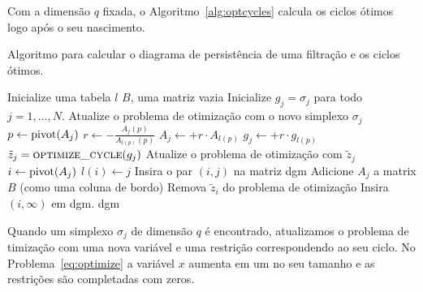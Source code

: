 Com a dimensão $q$ fixada, o Algoritmo~\ref{alg:optcycles} calcula os ciclos ótimos logo após 
o seu nascimento. 

\begin{algoritmo}[htpb!]
    \caption{Algoritmo para calcular o diagrama de persistência de uma filtração e os ciclos ótimos.}
    \label{alg:optcycles}
    \begin{algorithmic}[1]
            \State Inicialize uma tabela $l$
            \State $B$, uma matriz vazia
            \State Inicialize $g_j = \sigma_j$ para todo $j=1,\dots,N$.
                    \State Atualize o problema de otimização com o novo simplexo $\sigma_j$
                \EndIf
                    \State $p \leftarrow \text{pivot}(A_j)$
                    \State $r \leftarrow -\frac{A_j(p)}{A_{l(p)}(p)}$
                    \State $A_j \leftarrow + r \cdot A_{l(p)}$
                    \State $g_j \leftarrow + r \cdot g_{l(p)}$
                \EndWhile
                    \State $\tilde{z}_j = \textsc{optimize\_cycle}(g_j)$
                    \State Atualize o problema de otimização com $\tilde{z}_j$
                \EndIf
                    \State $i \leftarrow \text{pivot}(A_j)$
                    \State $l(i) \leftarrow j$ 
                    \State Insira o par $(i,j)$ na matriz dgm
                        \State Adicione $A_j$ a matrix $B$ (como uma coluna de bordo)
                        \State Remova $\tilde{z}_i$ do problema de otimização
                    \EndIf
                \EndIf
            \EndFor
                \State Insira $(i, \infty)$ em dgm. 
            \EndFor
            \State \Return dgm     
        \EndProcedure 
    \end{algorithmic}
\end{algoritmo}

Quando um simplexo $\sigma_j$ de dimensão $q$ é encontrado, atualizamos o problema de timização
com uma nova variável e uma restrição correspondendo ao seu ciclo. No Problema~\eqref{eq:optimize}
a variável $x$ aumenta em um no seu tamanho e as restrições são completadas com zeros.

